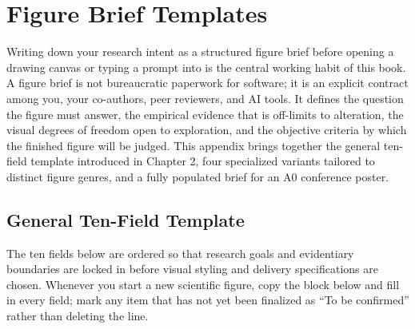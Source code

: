 \chapter{Figure Brief Templates}
\label{app:brief-templates}

Writing down your research intent as a structured figure brief before opening a drawing canvas or typing a prompt into \scidraw{} is the central working habit of this book. A figure brief is not bureaucratic paperwork for software; it is an explicit contract among you, your co-authors, peer reviewers, and AI tools. It defines the question the figure must answer, the empirical evidence that is off-limits to alteration, the visual degrees of freedom open to exploration, and the objective criteria by which the finished figure will be judged. This appendix brings together the general ten-field template introduced in Chapter 2, four specialized variants tailored to distinct figure genres, and a fully populated brief for an A0 conference poster.

\section{General Ten-Field Template}

The ten fields below are ordered so that research goals and evidentiary boundaries are locked in before visual styling and delivery specifications are chosen. Whenever you start a new scientific figure, copy the block below and fill in every field; mark any item that has not yet been finalized as ``To be confirmed'' rather than deleting the line.


